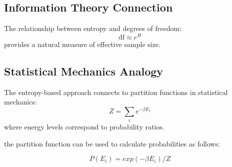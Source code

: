 \documentclass[12pt,a4paper]{article}
\begin{document}
\subsection{Information Theory Connection}
The relationship between entropy and degrees of freedom:
\begin{equation}
    \text{df} \approx e^H
\end{equation}
provides a natural measure of effective sample size.

\subsection{Statistical Mechanics Analogy}
The entropy-based approach connects to partition functions in statistical mechanics:
\begin{equation}
    Z = \sum_i e^{-\beta E_i}
\end{equation}
where energy levels correspond to probability ratios.

the partition function can be used to calculate probabilities as follows:

\begin{equation}
P(E_i) = exp(-\beta E_i) / Z
\end{equation}
\end{document}
